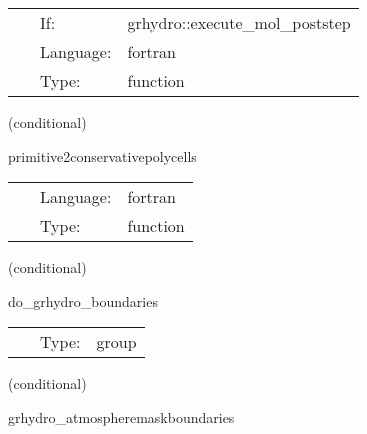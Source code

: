 \documentclass{article}
\begin{document}
\hspace{5mm}{\it convert back to primitive variables (polytype) } 


\hspace{5mm}

 \begin{tabular*}{160mm}{cll} 
~ & If:  & grhydro::execute\_mol\_poststep \\ 
~ & Language:  & fortran \\ 
~ & Type:  & function \\ 
\end{tabular*} 


\vspace{5mm}

   (conditional) 

\hspace{5mm} primitive2conservativepolycells 

\hspace{5mm}{\it convert initial data given in primive variables to conserved variables } 


\hspace{5mm}

 \begin{tabular*}{160mm}{cll} 
~ & Language:  & fortran \\ 
~ & Type:  & function \\ 
\end{tabular*} 


\vspace{5mm}

   (conditional) 

\hspace{5mm} do\_grhydro\_boundaries 

\hspace{5mm}{\it grhydro boundary conditions group } 


\hspace{5mm}

 \begin{tabular*}{160mm}{cll} 
~ & Type:  & group \\ 
\end{tabular*} 


\vspace{5mm}

   (conditional) 

\hspace{5mm} grhydro\_atmospheremaskboundaries 
\end{document}
